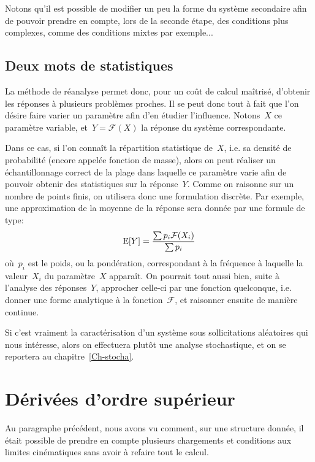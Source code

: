 Notons qu'il est possible de modifier un peu la forme du système secondaire afin de pouvoir prendre en compte, lors de la seconde étape, des conditions plus complexes, comme des conditions mixtes par exemple...

\medskip
\subsection{Deux mots de statistiques}\label{Sec-PInv-Stat}

La méthode de réanalyse permet donc, pour un coût de calcul maîtrisé, d'obtenir les réponses à plusieurs problèmes proches.
Il se peut donc tout à fait que l'on désire faire varier un paramètre afin d'en étudier l'influence. Notons~$X$ ce paramètre variable, et~$Y=\mathcal{F}(X)$ la réponse du système correspondante.

Dans ce cas, si l'on connaît la répartition statistique de~$X$, i.e. sa densité de probabilité (encore appelée fonction de masse), alors on peut réaliser un échantillonnage correct de la plage dans laquelle ce paramètre varie afin de pouvoir obtenir des statistiques sur la réponse~$Y$.
Comme on raisonne sur un nombre de points finis, on utilisera donc une formulation discrète. Par exemple, une approximation de la moyenne de la réponse sera donnée par une formule de type:
\begin{equation}\label{Eq-PInv-Stat}
\operatorname{E}[Y]=\dfrac{\sum p_i\mathcal{F}(X_i)}{\sum p_i}
\end{equation}
où~$p_i$ est le poids, ou la pondération, correspondant à la fréquence à laquelle la valeur~$X_i$ du paramètre~$X$ apparaît.
On pourrait tout aussi bien, suite à l'analyse des réponses~$Y$, approcher celle-ci par une fonction quelconque, i.e. donner une forme analytique à la fonction~$\mathcal{F}$, et raisonner ensuite de manière continue.

Si c'est vraiment la caractérisation d'un système sous sollicitations aléatoires qui nous intéresse, alors on effectuera plutôt une analyse stochastique, et on se reportera au chapitre~\ref{Ch-stocha}.

\medskip
\section{Dérivées d'ordre supérieur}\label{Sec-Deriv}

Au paragraphe précédent, nous avons vu comment, sur une structure donnée, il était possible de prendre en compte plusieurs chargements et conditions aux limites cinématiques sans avoir à refaire tout le calcul.

